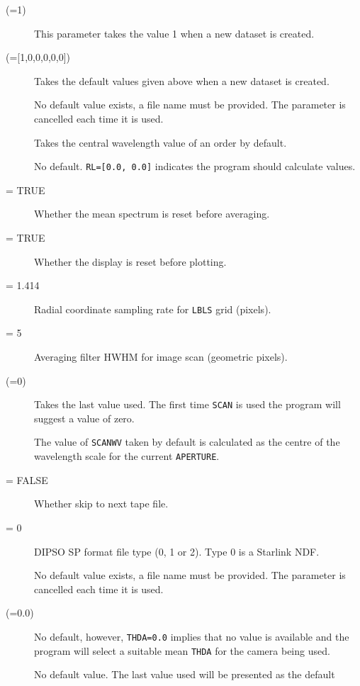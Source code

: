 \begin {description}
\item [ (=1)] \lmbox
   This parameter takes the value 1 when a new dataset is created.
\item [{ (=[1,0,0,0,0,0])}] \lmbox
   Takes the default values given above when a new dataset is created.
\item [] \lmbox
   No default value exists, a file name must be provided.
   The parameter is cancelled each time it is used.
\item [] \lmbox
   Takes the central wavelength value of an order by default.
\item [] \lmbox
   No default.  \verb+RL=[0.0, 0.0]+ indicates the program should calculate
   values.
\item [ = TRUE] \lmbox
   Whether the mean spectrum is reset before averaging.
\item [ = TRUE] \lmbox
   Whether the display is reset before plotting.
\item [ = 1.414] \lmbox
   Radial coordinate sampling rate for \verb+LBLS+ grid (pixels).
\item [ = 5] \lmbox
   Averaging filter HWHM for image scan (geometric pixels).
\item [ (=0)] \lmbox
   Takes the last value used.  The first time \verb+SCAN+ is used the
   program will suggest a value of zero.
\item [] \lmbox
   The value of \verb+SCANWV+ taken by default is calculated as the centre
   of the wavelength scale for the current \verb+APERTURE+\@.
\item [ = FALSE] \lmbox
   Whether skip to next tape file.
\item [ = 0] \lmbox
   DIPSO SP format file type (0, 1 or 2). Type 0 is a Starlink NDF.
\item [] \lmbox
   No default value exists, a file name must be provided.
   The parameter is cancelled each time it is used.
\item [ (=0.0)] \lmbox
   No default, however, \verb+THDA=0.0+ implies that no value is available
   and the program will select a suitable mean \verb+THDA+ for the camera
   being used.
\item [] \lmbox
   No default value.  The last value used will be presented as the default

\end{description}

